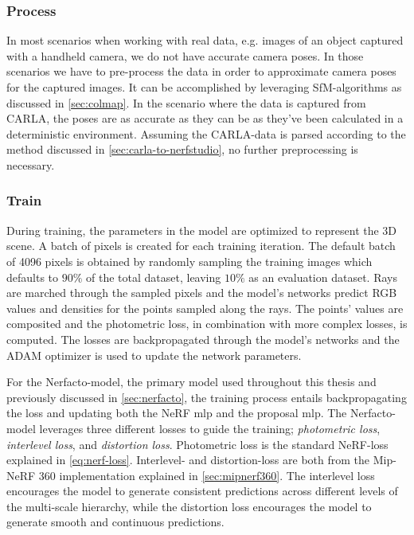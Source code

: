 \subsubsection{Process}

In most scenarios when working with real data, e.g. images of an object captured with a handheld camera, we do not have accurate camera poses. In those scenarios we have to pre-process the data in order to approximate camera poses for the captured images. It can be accomplished by leveraging SfM-algorithms as discussed in \autoref{sec:colmap}. In the scenario where the data is captured from CARLA, the poses are as accurate as they can be as they've been calculated in a deterministic environment. Assuming the CARLA-data is parsed according to the method discussed in \autoref{sec:carla-to-nerfstudio}, no further preprocessing is necessary.

\subsubsection{Train}
During training, the parameters in the model are optimized to represent the 3D scene. A batch of pixels is created for each training iteration. The default batch of 4096 pixels is obtained by randomly sampling the training images which defaults to $90\%$ of the total dataset, leaving $10\%$ as an evaluation dataset. Rays are marched through the sampled pixels and the model's networks predict RGB values and densities for the points sampled along the rays. The points' values are composited and the photometric loss, in combination with more complex losses, is computed. The losses are backpropagated through the model's networks and the ADAM optimizer\cite{adam} is used to update the network parameters.

For the Nerfacto-model, the primary model used throughout this thesis and previously discussed in \autoref{sec:nerfacto}, the training process entails backpropagating the loss and updating both the NeRF \acrshort{mlp} and the proposal \acrshort{mlp}. The Nerfacto-model leverages three different losses to guide the training; \textit{photometric loss}, \textit{interlevel loss}, and \textit{distortion loss}. Photometric loss is the standard NeRF-loss explained in \autoref{eq:nerf-loss}. Interlevel- and distortion-loss are both from the Mip-NeRF 360\cite{barron_mip-nerf_2022} implementation explained in \autoref{sec:mipnerf360}. The interlevel loss encourages the model to generate consistent predictions across different levels of the multi-scale hierarchy, while the distortion loss encourages the model to generate smooth and continuous predictions.

